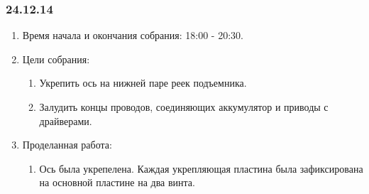 \subsubsection{24.12.14}
\begin{enumerate}
	
	\item Время начала и окончания собрания: 18:00 - 20:30.
	
	\item Цели собрания: 
	\begin{enumerate}
		
	    \item Укрепить ось на нижней паре реек подъемника.
			
		\item Залудить концы проводов, соединяющих аккумулятор и приводы с драйверами.
		
	\end{enumerate}

	\item Проделанная работа:
	\begin{enumerate}
		
		\item Ось была укрепелена. Каждая укрепляющая пластина была зафиксирована на основной пластине на два винта.
		

\end{enumerate}
\end{enumerate}
